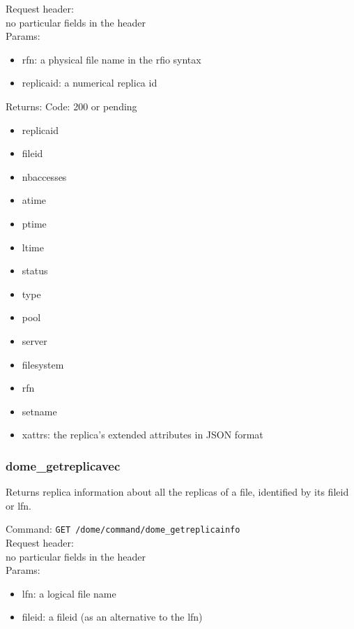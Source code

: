 \documentclass[a4paper,10pt]{scrreprt}
\begin{document}
Request header:\\
no particular fields in the header\\

Params:
\begin{itemize}
 \item rfn: a physical file name in the rfio syntax
 \item replicaid: a numerical replica id
\end{itemize}

Returns:
Code: 200 or pending
\begin{itemize}

 \item replicaid
 \item fileid
 \item nbaccesses
 \item atime
 \item ptime
 \item ltime
 \item status
 \item type
 \item pool
 \item server
 \item filesystem
 \item rfn
 \item setname
 \item xattrs: the replica's extended attributes in JSON format
\end{itemize}



\subsubsection{dome\_getreplicavec}
Returns replica information about all the replicas of a file, identified by its fileid or lfn.

Command:
\lstinline"GET /dome/command/dome_getreplicainfo"\\

Request header:\\
no particular fields in the header\\

Params:
\begin{itemize}
 \item lfn: a logical file name
 \item fileid: a fileid (as an alternative to the lfn)
\end{itemize}
\end{document}
